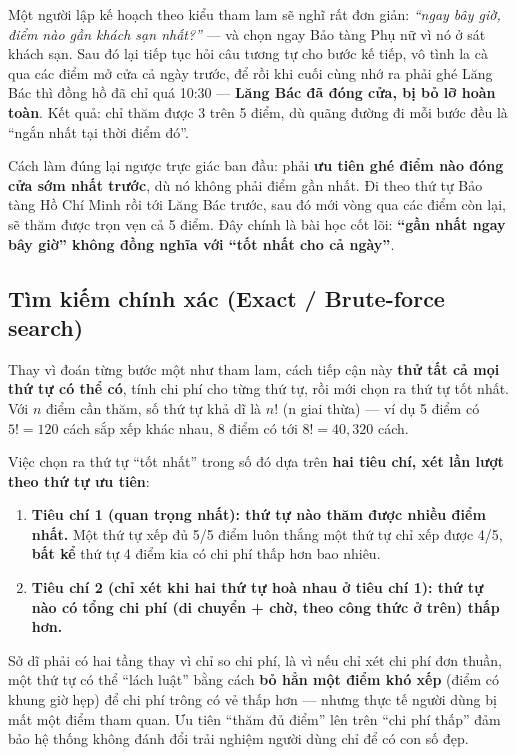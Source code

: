 \documentclass[12pt,a4paper]{article}
\begin{document}
Một người lập kế hoạch theo kiểu tham lam sẽ nghĩ rất đơn giản: \textit{``ngay
bây giờ, điểm nào gần khách sạn nhất?''} --- và chọn ngay Bảo tàng Phụ nữ vì nó
ở sát khách sạn. Sau đó lại tiếp tục hỏi câu tương tự cho bước kế tiếp, vô tình
la cà qua các điểm mở cửa cả ngày trước, để rồi khi cuối cùng nhớ ra phải ghé
Lăng Bác thì đồng hồ đã chỉ quá 10:30 --- \textbf{Lăng Bác đã đóng cửa, bị bỏ
lỡ hoàn toàn}. Kết quả: chỉ thăm được 3 trên 5 điểm, dù quãng đường đi mỗi bước
đều là ``ngắn nhất tại thời điểm đó''.

Cách làm đúng lại ngược trực giác ban đầu: phải \textbf{ưu tiên ghé điểm nào
đóng cửa sớm nhất trước}, dù nó không phải điểm gần nhất. Đi theo thứ tự Bảo
tàng Hồ Chí Minh rồi tới Lăng Bác trước, sau đó mới vòng qua các điểm còn lại,
sẽ thăm được trọn vẹn cả 5 điểm. Đây chính là bài học cốt lõi: \textbf{``gần
nhất ngay bây giờ'' không đồng nghĩa với ``tốt nhất cho cả ngày''}.

\subsection{Tìm kiếm chính xác (Exact / Brute-force search)}

Thay vì đoán từng bước một như tham lam, cách tiếp cận này \textbf{thử tất cả
mọi thứ tự có thể có}, tính chi phí cho từng thứ tự, rồi mới chọn ra thứ tự tốt
nhất. Với $n$ điểm cần thăm, số thứ tự khả dĩ là $n!$ (n giai thừa) --- ví dụ 5
điểm có $5! = 120$ cách sắp xếp khác nhau, 8 điểm có tới $8! = 40{,}320$ cách.

Việc chọn ra thứ tự ``tốt nhất'' trong số đó dựa trên \textbf{hai tiêu chí, xét
lần lượt theo thứ tự ưu tiên}:
\begin{enumerate}[nosep]
  \item \textbf{Tiêu chí 1 (quan trọng nhất): thứ tự nào thăm được nhiều điểm
  nhất.} Một thứ tự xếp đủ 5/5 điểm luôn thắng một thứ tự chỉ xếp được 4/5,
  \textbf{bất kể} thứ tự 4 điểm kia có chi phí thấp hơn bao nhiêu.
  \item \textbf{Tiêu chí 2 (chỉ xét khi hai thứ tự hoà nhau ở tiêu chí 1):
  thứ tự nào có tổng chi phí (di chuyển + chờ, theo công thức ở trên) thấp
  hơn.}
\end{enumerate}
Sở dĩ phải có hai tầng thay vì chỉ so chi phí, là vì nếu chỉ xét chi phí đơn
thuần, một thứ tự có thể ``lách luật'' bằng cách \textbf{bỏ hẳn một điểm khó
xếp} (điểm có khung giờ hẹp) để chi phí trông có vẻ thấp hơn --- nhưng thực tế
người dùng bị mất một điểm tham quan. Ưu tiên ``thăm đủ điểm'' lên trên ``chi
phí thấp'' đảm bảo hệ thống không đánh đổi trải nghiệm người dùng chỉ để có
con số đẹp.
\end{document}
